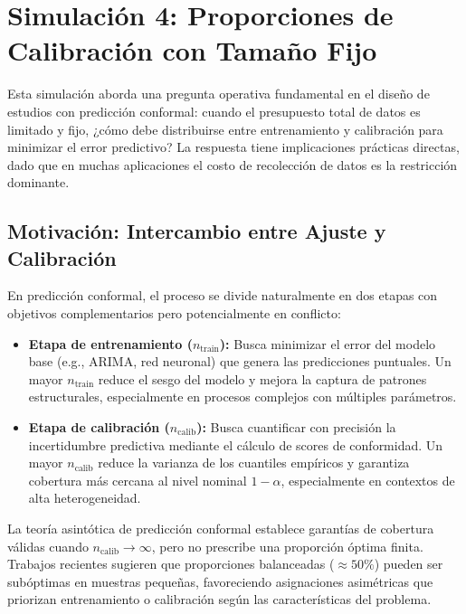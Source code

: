 \section{Simulación 4: Proporciones de Calibración con Tamaño Fijo}
\label{sec:resultados_proporciones}

Esta simulación aborda una pregunta operativa fundamental en el diseño de estudios con predicción conformal: cuando el presupuesto total de datos es limitado y fijo, ¿cómo debe distribuirse entre entrenamiento y calibración para minimizar el error predictivo? La respuesta tiene implicaciones prácticas directas, dado que en muchas aplicaciones el costo de recolección de datos es la restricción dominante.

\subsection{Motivación: Intercambio entre Ajuste y Calibración}
\label{subsec:motivacion_proporciones}

En predicción conformal, el proceso se divide naturalmente en dos etapas con objetivos complementarios pero potencialmente en conflicto:

\begin{itemize}
\item \textbf{Etapa de entrenamiento ($n_{\text{train}}$):} Busca minimizar el error del modelo base (e.g., ARIMA, red neuronal) que genera las predicciones puntuales. Un mayor $n_{\text{train}}$ reduce el sesgo del modelo y mejora la captura de patrones estructurales, especialmente en procesos complejos con múltiples parámetros.

\item \textbf{Etapa de calibración ($n_{\text{calib}}$):} Busca cuantificar con precisión la incertidumbre predictiva mediante el cálculo de scores de conformidad. Un mayor $n_{\text{calib}}$ reduce la varianza de los cuantiles empíricos y garantiza cobertura más cercana al nivel nominal $1-\alpha$, especialmente en contextos de alta heterogeneidad.
\end{itemize}

La teoría asintótica de predicción conformal establece garantías de cobertura válidas cuando $n_{\text{calib}} \to \infty$, pero no prescribe una proporción óptima finita. Trabajos recientes sugieren que proporciones balanceadas ($\approx 50\%$) pueden ser subóptimas en muestras pequeñas, favoreciendo asignaciones asimétricas que priorizan entrenamiento o calibración según las características del problema.


